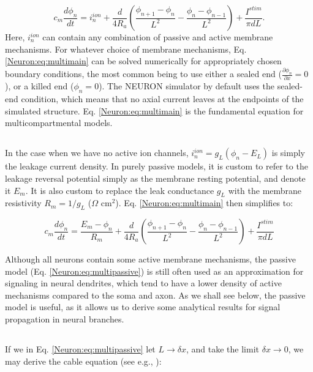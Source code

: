 \begin{equation}
c_m \frac{d\phi_n}{dt} = i_n^{ion} + \frac{d}{4R_a}\left(\frac{\phi_{n+1}-\phi_n}{L^2} - \frac{\phi_n-\phi_{n-1}}{L^2} \right) + \frac{I^{stim}}{\pi d L}.
\label{Neuron:eq:multimain}
\end{equation}
Here,  $i_n^{ion}$ can contain any combination of passive and active membrane mechanisms. For whatever choice of membrane mechanisms, Eq. \ref{Neuron:eq:multimain} can be solved numerically for appropriately chosen boundary conditions, the most common being to use either a sealed end ($\frac{\partial \phi_n}{\partial x} = 0$), or a killed end ($\phi_n=0$). The NEURON simulator by default uses the sealed-end condition, which means that no axial current leaves at the endpoints of the simulated structure. Eq. \ref{Neuron:eq:multimain} is the fundamental equation for multicompartmental models.


\subsection{}
\label{sec:Neuron:Passive_multicomp}

In the case when we have no active ion channels, $i_n^{ion} = g_L(\phi_n - E_L)$ is simply the leakage current density. In purely passive models, it is custom to refer to the leakage reversal potential simply as the membrane resting potential, and denote it $E_m$. It is also custom to replace the leak conductance $g_L$ with the membrane resistivity $R_m = 1/g_L$ ($\Omega$ cm$^2$). Eq. \ref{Neuron:eq:multimain} then simplifies to:

\begin{equation}
c_m \frac{d\phi_n}{dt} = \frac{E_m-\phi_n}{R_m} + \frac{d}{4R_a}\left(\frac{\phi_{n+1}-\phi_n}{L^2} - \frac{\phi_n-\phi_{n-1}}{L^2} \right) + \frac{I^{stim}}{\pi d L}
\label{Neuron:eq:multipassive}
\end{equation}

Although all neurons contain some active membrane mechanisms, the passive model (Eq. \ref{Neuron:eq:multipassive}) is still often used as an approximation for signaling in neural dendrites, which tend to have a lower density of active mechanisms compared to the soma and axon. As we shall see below, the passive model is useful, as it allows us to derive some analytical results for signal propagation in neural branches.


\subsection{}
\label{sec:Neuron:cableeq}
If we in Eq. \ref{Neuron:eq:multipassive} let $L \rightarrow \delta x$, and take the limit $\delta x \rightarrow 0$, we may derive the cable equation (see e.g., \cite{Sterratt2011}): 


